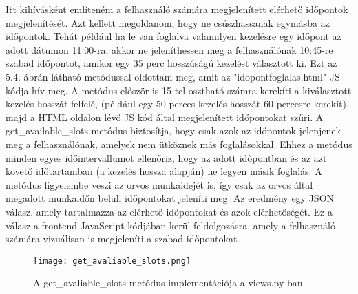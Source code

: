 \begin{enumerate}
	 Itt kihívásként említeném a felhasználó számára megjelenített elérhető időpontok megjelenítését. Azt kellett megoldanom, hogy ne csúszhassanak egymásba az időpontok. Tehát például ha le van foglalva valamilyen kezelésre egy időpont az adott dátumon 11:00-ra, akkor ne jeleníthessen meg a felhasználónak 10:45-re szabad időpontot, amikor egy 35 perc hosszúságú kezelést választott ki. Ezt az 5.4. ábrán látható metódussal oldottam meg, amit az "idopontfoglalas.html" JS kódja hív meg. A metódus először is 15-tel osztható számra kerekíti a kiválasztott kezelés hosszát felfelé, (például egy 50 perces kezelés hosszát 60 percesre kerekít), majd a HTML oldalon lévő JS kód által megjelenített időpontokat szűri. A get\_available\_slots metódus biztosítja, hogy csak azok az időpontok jelenjenek meg a felhasználónak, amelyek nem ütköznek más foglalásokkal. Ehhez a metódus minden egyes időintervallumot ellenőriz, hogy az adott időpontban és az azt követő időtartamban (a kezelés hossza alapján) ne legyen másik foglalás. A metódus figyelembe veszi az orvos munkaidejét is, így csak az orvos által megadott munkaidőn belüli időpontokat jeleníti meg. Az eredmény egy JSON válasz, amely tartalmazza az elérhető időpontokat és azok elérhetőségét. Ez a válasz a frontend JavaScript kódjában kerül feldolgozásra, amely a felhasználó számára vizuálisan is megjeleníti a szabad időpontokat.
	 
	  \begin{figure}[!htbp]
	 	\caption{A get\_avaliable\_slots metódus implementációja a views.py-ban}
	 	\label{fig:getavaliableslots}
	 	\centering
	 	\texttt{[image: get\_avaliable\_slots.png]}
	 \end{figure}
	 

\end{enumerate}
